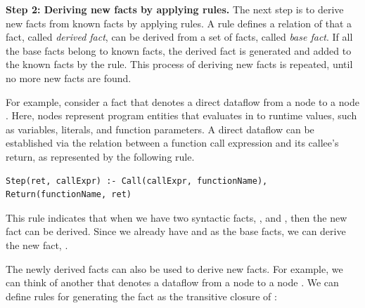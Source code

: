 
\smallskip
\textbf{Step 2: Deriving new facts by applying rules.}
The next step is to derive new facts from known facts by applying rules.
A rule defines a relation of that a fact, called {\it derived fact}, can be
derived from a set of facts, called {\it base fact}. 
If all the base facts belong to known facts, the derived fact is generated and
added to the known facts by the rule.
This process of deriving new facts is repeated, until no more new facts are
found.


For example, consider a fact  that denotes a direct dataflow
from a node  to a node . 
Here, nodes represent program entities that evaluates in to runtime values,
such as variables, literals, and function parameters. 
A direct dataflow can be established via the relation between a function call
expression and its callee's return, as represented by the following rule.
\begin{lstlisting}[style=mrule]
Step(ret, callExpr) :- Call(callExpr, functionName), Return(functionName, ret)
\end{lstlisting}

\noindent
This rule indicates that when we have two syntactic facts, ,
and , then the new fact  can be derived.
Since we already have  and  as the base facts,
we can derive the new fact, .

The newly derived facts  can also be used to derive new facts.
For example, we can think of another  that denotes a dataflow from a
node  to a node .
We can define rules for generating the fact as the transitive closure of :

